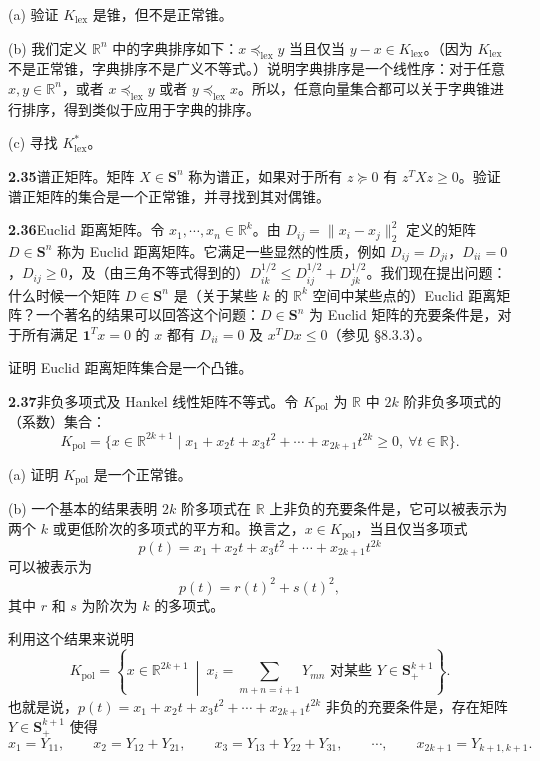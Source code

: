 \documentclass[UTF8, 12pt, fontset=fandol, oneside]{ctexart}
\begin{document}
\noindent(a) 验证 $K_{\mathrm{lex}}$ 是锥，但不是正常锥。

\noindent(b) 我们定义 $\mathbb{R}^n$ 中的字典排序如下：$x\preceq_{\mathrm{lex}}y$ 当且仅当 $y-x\in K_{\mathrm{lex}}$。（因为 $K_{\mathrm{lex}}$ 不是正常锥，字典排序不是广义不等式。）说明字典排序是一个线性序：对于任意 $x,y\in\mathbb{R}^n$，或者 $x\preceq_{\mathrm{lex}}y$ 或者 $y\preceq_{\mathrm{lex}}x$。所以，任意向量集合都可以关于字典锥进行排序，得到类似于应用于字典的排序。

\noindent(c) 寻找 $K_{\mathrm{lex}}^*$。

\noindent\textbf{2.35}\quad 谱正矩阵。矩阵 $X\in\mathbf{S}^n$ 称为谱正，如果对于所有 $z\succeq0$ 有 $z^TXz\ge0$。验证谱正矩阵的集合是一个正常锥，并寻找到其对偶锥。

\noindent\textbf{2.36}\quad Euclid 距离矩阵。令 $x_1,\cdots,x_n\in\mathbb{R}^k$。由 $D_{ij}=\|x_i-x_j\|_2^2$ 定义的矩阵 $D\in\mathbf{S}^n$ 称为 Euclid 距离矩阵。它满足一些显然的性质，例如 $D_{ij}=D_{ji}$，$D_{ii}=0$，$D_{ij}\ge0$，及（由三角不等式得到的）$D_{ik}^{1/2}\le D_{ij}^{1/2}+D_{jk}^{1/2}$。我们现在提出问题：什么时候一个矩阵 $D\in\mathbf{S}^n$ 是（关于某些 $k$ 的 $\mathbb{R}^k$ 空间中某些点的）Euclid 距离矩阵？一个著名的结果可以回答这个问题：$D\in\mathbf{S}^n$ 为 Euclid 矩阵的充要条件是，对于所有满足 $\mathbf{1}^Tx=0$ 的 $x$ 都有 $D_{ii}=0$ 及 $x^TDx\le0$（参见 \S8.3.3）。

证明 Euclid 距离矩阵集合是一个凸锥。

\noindent\textbf{2.37}\quad 非负多项式及 Hankel 线性矩阵不等式。令 $K_{\mathrm{pol}}$ 为 $\mathbb{R}$ 中 $2k$ 阶非负多项式的（系数）集合：
\[
  K_{\mathrm{pol}}=\{x\in\mathbb{R}^{2k+1}\mid x_1+x_2t+x_3t^2+\cdots+x_{2k+1}t^{2k}\ge0,\ \forall t\in\mathbb{R}\}.
\]

\noindent(a) 证明 $K_{\mathrm{pol}}$ 是一个正常锥。

\noindent(b) 一个基本的结果表明 $2k$ 阶多项式在 $\mathbb{R}$ 上非负的充要条件是，它可以被表示为两个 $k$ 或更低阶次的多项式的平方和。换言之，$x\in K_{\mathrm{pol}}$，当且仅当多项式
\[
  p(t)=x_1+x_2t+x_3t^2+\cdots+x_{2k+1}t^{2k}
\]
可以被表示为
\[
  p(t)=r(t)^2+s(t)^2,
\]
其中 $r$ 和 $s$ 为阶次为 $k$ 的多项式。

利用这个结果来说明
\[
  K_{\mathrm{pol}}=
  \left\{x\in\mathbb{R}^{2k+1}\ \middle|\ x_i=\sum_{m+n=i+1}Y_{mn}\text{ 对某些 }Y\in\mathbf{S}_+^{k+1}\right\}.
\]
也就是说，$p(t)=x_1+x_2t+x_3t^2+\cdots+x_{2k+1}t^{2k}$ 非负的充要条件是，存在矩阵 $Y\in\mathbf{S}_+^{k+1}$ 使得
\[
  x_1=Y_{11},\qquad
  x_2=Y_{12}+Y_{21},\qquad
  x_3=Y_{13}+Y_{22}+Y_{31},\qquad \cdots,\qquad
  x_{2k+1}=Y_{k+1,k+1}.
\]
\end{document}
